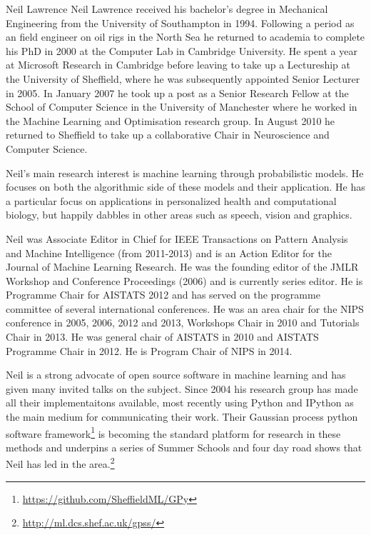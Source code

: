\begin{participant}[PM=6,salary=10000]{Neil Lawrence}
  Neil Lawrence received his bachelor's degree in Mechanical Engineering from the
  University of Southampton in 1994. Following a period as an field engineer on oil rigs
  in the North Sea he returned to academia to complete his PhD in 2000 at the Computer Lab
  in Cambridge University. He spent a year at Microsoft Research in Cambridge before
  leaving to take up a Lectureship at the University of Sheffield, where he was
  subsequently appointed Senior Lecturer in 2005. In January 2007 he took up a post as a
  Senior Research Fellow at the School of Computer Science in the University of Manchester
  where he worked in the Machine Learning and Optimisation research group. In August 2010
  he returned to Sheffield to take up a collaborative Chair in Neuroscience and Computer
  Science.

  Neil's main research interest is machine learning through probabilistic models. He
  focuses on both the algorithmic side of these models and their application. He has a
  particular focus on applications in personalized health and computational biology, but
  happily dabbles in other areas such as speech, vision and graphics.

  Neil was Associate Editor in Chief for IEEE Transactions on Pattern Analysis and Machine
  Intelligence (from 2011-2013) and is an Action Editor for the Journal of Machine
  Learning Research. He was the founding editor of the JMLR Workshop and Conference
  Proceedings (2006) and is currently series editor. He is Programme Chair for AISTATS
  2012 and has served on the programme committee of several international conferences. He
  was an area chair for the NIPS conference in 2005, 2006, 2012 and 2013, Workshops Chair
  in 2010 and Tutorials Chair in 2013. He was general chair of AISTATS in 2010 and AISTATS
  Programme Chair in 2012. He is Program Chair of NIPS in 2014.

  Neil is a strong advocate of open source software in machine learning and has given many
  invited talks on the subject. Since 2004 his research group has made all their
  implementaitons available, most recently using Python and IPython as the main medium for
  communicating their work. Their Gaussian process python software
  framework\footnote{\url{https://github.com/SheffieldML/GPy}} is becoming the standard
  platform for research in these methods and underpins a series of Summer Schools and four
  day road shows that Neil has led in the
  area.\footnote{\url{http://ml.dcs.shef.ac.uk/gpss/}}
\end{participant}
